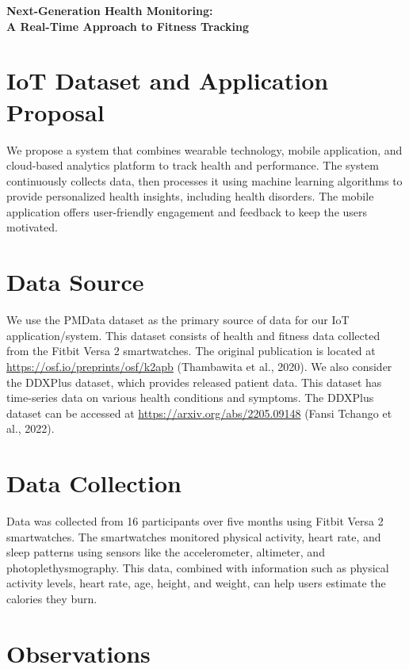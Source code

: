 \documentclass[10pt]{extarticle}
\begin{document}
\begin{center}
    {\LARGE \textbf{Next-Generation Health Monitoring:}} \\
    {\large \textbf{A Real-Time Approach to Fitness Tracking}}
\end{center}

\section{IoT Dataset and Application Proposal}

We propose a system that combines wearable technology, mobile application, and cloud-based analytics platform to track health and performance. The system continuously collects data, then processes it using machine learning algorithms to provide personalized health insights, including health disorders. The mobile application offers user-friendly engagement and feedback to keep the users motivated.

\section{Data Source}

We use the PMData dataset as the primary source of data for our IoT application/system. This dataset consists of health and fitness data collected from the Fitbit Versa 2 smartwatches. The original publication is located at \url{https://osf.io/preprints/osf/k2apb} (Thambawita et al., 2020). We also consider the DDXPlus dataset, which provides released patient data. This dataset has time-series data on various health conditions and symptoms. The DDXPlus dataset can be accessed at \url{https://arxiv.org/abs/2205.09148} (Fansi Tchango et al., 2022).

\section{Data Collection}

Data was collected from 16 participants over five months using Fitbit Versa 2 smartwatches. The smartwatches monitored physical activity, heart rate, and sleep patterns using sensors like the accelerometer, altimeter, and photoplethysmography. This data, combined with information such as physical activity levels, heart rate, age, height, and weight, can help users estimate the calories they burn.

\section{Observations}
\end{document}
